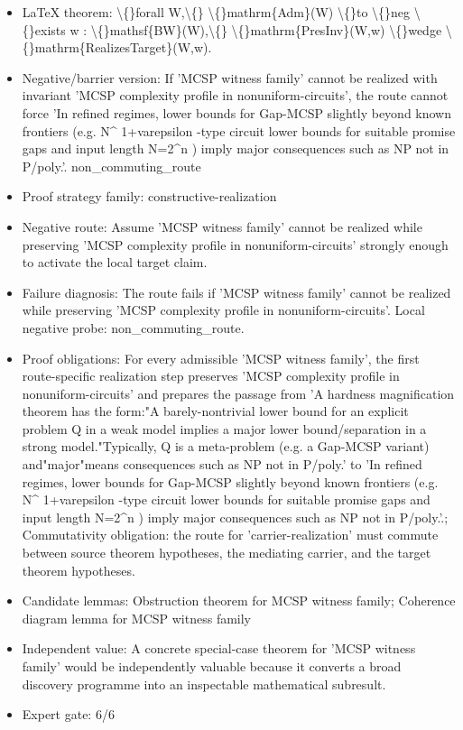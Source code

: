 \documentclass[11pt]{article}
\begin{document}
\begin{itemize}
\item LaTeX theorem: \textbackslash\{\}forall W,\textbackslash\{\} \textbackslash\{\}mathrm\{Adm\}(W) \textbackslash\{\}to \textbackslash\{\}neg \textbackslash\{\}exists w : \textbackslash\{\}mathsf\{BW\}(W),\textbackslash\{\} \textbackslash\{\}mathrm\{PresInv\}(W,w) \textbackslash\{\}wedge \textbackslash\{\}mathrm\{RealizesTarget\}(W,w).
\item Negative/barrier version: If 'MCSP witness family' cannot be realized with invariant 'MCSP complexity profile in nonuniform-circuits', the route cannot force 'In refined regimes, lower bounds for Gap-MCSP slightly beyond known frontiers (e.g. N\textasciicircum{} 1+varepsilon -type circuit lower bounds for suitable promise gaps and input length N=2\textasciicircum{}n ) imply major consequences such as NP not in P/poly.'. non\_commuting\_route
\item Proof strategy family: constructive-realization
\item Negative route: Assume 'MCSP witness family' cannot be realized while preserving 'MCSP complexity profile in nonuniform-circuits' strongly enough to activate the local target claim.
\item Failure diagnosis: The route fails if 'MCSP witness family' cannot be realized while preserving 'MCSP complexity profile in nonuniform-circuits'. Local negative probe: non\_commuting\_route.
\item Proof obligations: For every admissible 'MCSP witness family', the first route-specific realization step preserves 'MCSP complexity profile in nonuniform-circuits' and prepares the passage from 'A hardness magnification theorem has the form:"A barely-nontrivial lower bound for an explicit problem Q in a weak model implies a major lower bound/separation in a strong model."Typically, Q is a meta-problem (e.g. a Gap-MCSP variant) and"major"means consequences such as NP not in P/poly.' to 'In refined regimes, lower bounds for Gap-MCSP slightly beyond known frontiers (e.g. N\textasciicircum{} 1+varepsilon -type circuit lower bounds for suitable promise gaps and input length N=2\textasciicircum{}n ) imply major consequences such as NP not in P/poly.'.; Commutativity obligation: the route for 'carrier-realization' must commute between source theorem hypotheses, the mediating carrier, and the target theorem hypotheses.
\item Candidate lemmas: Obstruction theorem for MCSP witness family; Coherence diagram lemma for MCSP witness family
\item Independent value: A concrete special-case theorem for 'MCSP witness family' would be independently valuable because it converts a broad discovery programme into an inspectable mathematical subresult.
\item Expert gate: 6/6
\end{itemize}
\end{document}
